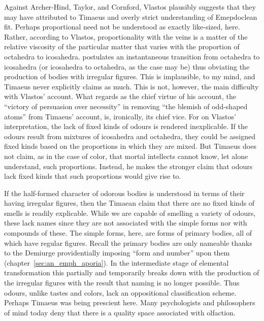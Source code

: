 Against Archer-Hind, Taylor, and Cornford, Vlastos plausibly suggests that they may have attributed to Timaeus and overly strict understanding of Emepdoclean fit. Perhaps proportional need not be understood as exactly like-sized, here. Rather, according to Vlastos, proportionality with the veins is a matter of the relative viscosity of the particular matter that varies with the proportion of octahedra to icosahedra. \citet[206-7]{Vlastos:1967jw} postulates an instantaneous transition from octahedra to icosahedra (or icosahedra to octahedra, as the case may be) thus obviating the production of bodies with irregular figures. This is implausible, to my mind, and Timaeus never explicitly claims as much. This is not, however, the main difficulty with Vlastos' account. What \citet[204 n, 209]{Vlastos:1967jw} regards as the chief virtue of his account, the ``victory of persuasion over necessity'' in removing ``the blemish of odd-shaped atoms'' from Timaeus' account, is, ironically, its chief vice. For on Vlastos' interpretation, the lack of fixed kinds of odours is rendered inexplicable. If the odours result from mixtures of icosahedra and octahedra, they could be assigned fixed kinds based on the proportions in which they are mixed. But Timaeus does not claim, as in the case of color, that mortal intellects cannot know, let alone understand, such proportions. Instead, he makes the stronger claim that odours lack fixed kinds that such proportions would give rise to.

If the half-formed character of odorous bodies is understood in terms of their having irregular figures, then the Timaean claim that there are no fixed kinds of smells is readily explicable. While we are capable of smelling a variety of odours, these lack names since they are not associated with the simple forms nor with compounds of these. The simple forms, here, are forms of primary bodies, all of which have regular figures. Recall the primary bodies are only nameable thanks to the Demiurge providentially imposing ``form and number'' upon them (chapter~\ref{sec:an_emph_aporia}). In the intermediate stage of elemental transformation this partially and temporarily breaks down with the production of the irregular figures with the result that naming is no longer possible. Thus odours, unlike tastes and colors, lack an oppositional classification scheme. Perhaps Timaeus was being prescient here. Many psychologists and philosophers of mind today deny that there is a quality space associated with olfaction.


